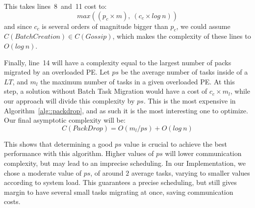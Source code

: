 This takes lines~8~and~11 cost to:
\begin{equation}
 max((p_c\times m),\ (c_c\times log\ n))
\end{equation}
and since $c_c$ is several orders of magnitude bigger than $p_c$, we could assume $C(BatchCreation)\in C(Gossip)$, which makes the 
complexity of these lines to $O(log\ n)$.

Finally, line~14 will have a complexity equal to the largest number of packs migrated by an overloaded PE.
Let $ps$ be the average number of tasks inside of a $LT$, and $m_l$ the maximum number of tasks in a given overloaded PE.
At this step, a solution without Batch Task Migration would have a cost of $c_c\times m_l$, while our approach will divide this complexity by $ps$. 
This is the most expensive in Algorithm~\ref{alg::packdrop}, and as such it is the most interesting one to optimize.
Our final asymptotic complexity will be:
\begin{equation}
 C(PackDrop) = O(m_l/ps) + O(log\ n)
 \label{eq:worstcase}
\end{equation}

This shows that determining a good $ps$ value is crucial to achieve the best performance with this algorithm.
Higher values of $ps$ will lower communication complexity, but may lead to an imprecise scheduling.
In our Implementation, we chose a moderate value of $ps$, of around $2$ average tasks, varying to smaller values according to system load.
This guarantees a precise scheduling, but still gives margin to have several small tasks migrating at once, saving communication costs.

